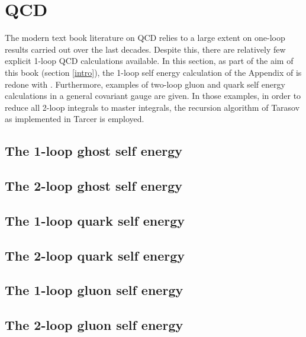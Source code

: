 \section{QCD}

The modern text book literature on QCD relies to a large extent on one-loop results
carried out over the last decades. Despite this, there are relatively few explicit 1-loop
QCD calculations available.
In this section, as part of the aim of this book (section \ref{intro}),
the 1-loop self energy calculation of the Appendix of \cite{Muta:vi} is
redone with \fc.
Furthermore, examples of two-loop gluon and quark self energy calculations in a general
covariant gauge are given. In those examples, in order to reduce all 2-loop integrals to
master integrals, the recursion algorithm of Tarasov \cite{Tarasov:1997kx} as implemented in
Tarcer \cite{Mertig:1998vk} is employed.

\subsection{The 1-loop ghost self energy }

\subsection{The 2-loop ghost self energy }

\subsection{The 1-loop quark self energy }

\subsection{The 2-loop quark self energy }

\subsection{The 1-loop gluon self energy }

\subsection{The 2-loop gluon self energy }

%
%
%
%

